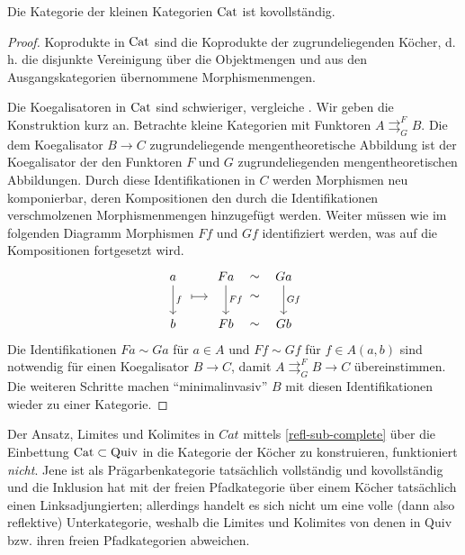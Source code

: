 \begin{prop} \label{cat-cocomplete}
  Die Kategorie der kleinen Kategorien $\operatorname{Cat}$ ist kovollständig.
\end{prop}
\begin{proof}
  Koprodukte in $\operatorname{Cat}$ sind die Koprodukte der zugrundeliegenden
  Köcher, d. h. die disjunkte Vereinigung über die Objektmengen und
  aus den Ausgangskategorien übernommene Morphismenmengen.

  Die Koegalisatoren in $\operatorname{Cat}$ sind schwieriger, vergleiche
  \cite{BBP}. Wir geben die Konstruktion kurz an. Betrachte kleine
  Kategorien mit Funktoren $A
  \mathrel{\mathop{\rightrightarrows}^{F}_{G}} B$. Die dem
  Koegalisator $B \to C$ zugrundeliegende mengentheoretische Abbildung
  ist der Koegalisator der den Funktoren $F$ und $G$ zugrundeliegenden
  mengentheoretischen Abbildungen. Durch diese Identifikationen in $C$
  werden Morphismen neu komponierbar, deren Kompositionen den durch
  die Identifikationen verschmolzenen Morphismenmengen hinzugefügt
  werden. Weiter müssen wie im folgenden Diagramm Morphismen $Ff$ und
  $Gf$ identifiziert werden, was auf die Kompositionen fortgesetzt
  wird.
  \[ 
  \begin{tikzcd}
    a \ar{dd}{f}
    & Fa \rar[phantom]{\sim} \ar{dd}{Ff} & Ga \ar{dd}{Gf}  \\[-10pt]
    \rar[mapsto, shorten <= 2em, xshift = -1em]
    & \rar[phantom]{\sim} & \lar[phantom] \\[-10pt]
    b & Fb \rar[phantom]{\sim} & Gb
  \end{tikzcd}
  \]  
  Die Identifikationen $Fa \sim Ga$ für $a \in A$ und $Ff \sim Gf$ für
  $f \in A(a, b)$ sind notwendig für einen Koegalisator $B \to C$,
  damit $A \mathrel{\mathop{\rightrightarrows}^{F}_{G}} B \to C$
  übereinstimmen. Die weiteren Schritte machen ``minimalinvasiv'' $B$
  mit diesen Identifikationen wieder zu einer Kategorie.
\end{proof}
\begin{bem}
  Der Ansatz, Limites und Kolimites in $Cat$ mittels
  \ref{refl-sub-complete} über die Einbettung $\operatorname{Cat} \subset
  \mathrm{Quiv}$ in die Kategorie der Köcher zu konstruieren,
  funktioniert \emph{nicht}. Jene ist als Prägarbenkategorie
  tatsächlich vollständig und kovollständig und die Inklusion hat mit
  der freien Pfadkategorie über einem Köcher tatsächlich einen
  Linksadjungierten; allerdings handelt es sich nicht um eine volle
  (dann also reflektive) Unterkategorie, weshalb die Limites und
  Kolimites von denen in $\mathrm{Quiv}$ bzw. ihren freien
  Pfadkategorien abweichen.
\end{bem}
